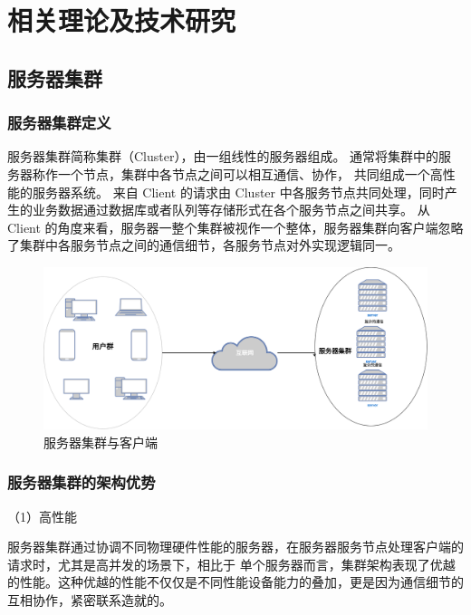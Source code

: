  \chapter{相关理论及技术研究}

\section{服务器集群}

\subsection{服务器集群定义}

服务器集群简称集群（Cluster），由一组线性的服务器组成。
通常将集群中的服务器称作一个节点，集群中各节点之间可以相互通信、协作，
共同组成一个高性能的服务器系统\cite{kanellopoulos2022dynamic}。
来自 Client 的请求由 Cluster 中各服务节点共同处理，同时产生的业务数据通过数据库或者队列等存储形式在各个服务节点之间共享。
从 Client 的角度来看，服务器一整个集群被视作一个整体，服务器集群向客户端忽略了集群中各服务节点之间的通信细节，各服务节点对外实现逻辑同一。

\begin{figure}[ht]
  \centering
  \includegraphics[width=\textwidth]{figures/cluster-and-client.png}
  \caption{服务器集群与客户端}
\end{figure}

\subsection{服务器集群的架构优势}

（1）高性能

服务器集群通过协调不同物理硬件性能的服务器，在服务器服务节点处理客户端的请求时，尤其是高并发的场景下，相比于
单个服务器而言，集群架构表现了优越的性能。这种优越的性能不仅仅是不同性能设备能力的叠加，更是因为通信细节的互相协作，紧密联系造就的。

